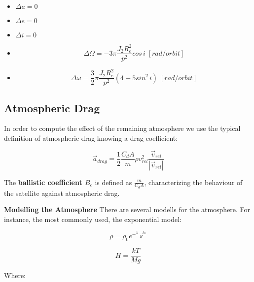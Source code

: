 \begin{itemize}
\item $\Delta a = 0$
\item $\Delta e = 0$
\item $\Delta i = 0$
\item 
\begin{equation}\Delta\Omega = -3\pi \frac{J_{2}R_{e}^2}{p^2}cos\,i\; [rad/orbit]
\end{equation}
\item 
\begin{equation}\Delta\omega = \frac{3}{2} \pi \frac{J_{2}R_{e}^2}{p^2}(4-5sin^2\,i)\; [rad/orbit]
\end{equation}

\end{itemize}

\subsection{Atmospheric Drag}
In order to compute the effect of the remaining atmosphere we use the typical definition of atmospheric drag knowing a drag coefficient:

\begin{equation}
\vec{a}_{drag}= \frac{1}{2}\frac{C_{d}A}{m}\rho v_{rel}^2 \frac{\vec{v}_{rel}}{|\vec{v}_{rel}|}
\end{equation}

The \textbf{ballistic coefficient $B_{c}$} is defined as $\frac{m}{C_{d}A}$, characterizing the behaviour of the satellite against atmospheric drag.\newline

\textbf{Modelling the Atmosphere}\newline
There are several modells for the atmosphere. For instance, the most commonly used, the exponential model:

\begin{equation}
\rho = \rho_{0} e^{-\frac{h-h_{0}}{H}}
\end{equation}

\begin{equation}
H = \frac{kT}{Mg}
\end{equation}

Where:

